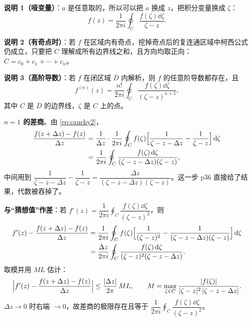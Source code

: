 \documentclass[11pt]{ctexart}
\let\origsubhdr\subhdr
\renewcommand{\subhdr}[1]{\par\needspace{4\baselineskip}\origsubhdr{#1}}
\begin{document}


\textbf{说明 1（哑变量）}：$a$ 是任意取的，所以可以把 $a$ 换成 $z$，把积分变量换成 $\zeta$：
\begin{equation}\label{eq:cauchy2}
f(z)=\frac{1}{2\pi i}\oint_C\frac{f(\zeta)\dd\zeta}{\zeta-z} .
\end{equation}


\textbf{说明 2（有奇点时）}：若 $f$ 在区域内有奇点，挖掉奇点后的复连通区域中柯西公式仍成立，只要把 $C$ 理解成所有边界线之和，且方向均取正向：$C=c_0+c_1+\cdots+c_n$。

\textbf{说明 3（高阶导数）}：若 $f$ 在闭区域 $\overline{D}$ 内解析，则 $f$ 的任意阶导数都存在，且
\begin{equation}\label{eq:highderiv}
f^{(n)}(z)=\frac{n!}{2\pi i}\oint_C\frac{f(\zeta)\dd\zeta}{(\zeta-z)^{n+1}} ,
\end{equation}
其中 $C$ 是 $\overline{D}$ 的边界线，$\zeta$ 是 $C$ 上的点。


\textbf{$n=1$ 的差商}。由 \eqref{eq:cauchy2}，
\begin{align}
\frac{f(z+\Delta z)-f(z)}{\Delta z}
&=\frac{1}{\Delta z}\cdot\frac{1}{2\pi i}\oint_C f(\zeta)
\Bigl[\frac{1}{\zeta-z-\Delta z}-\frac{1}{\zeta-z}\Bigr]\,\mathrm{d}\zeta\notag\\
&=\frac{1}{2\pi i}\oint_C\frac{f(\zeta)\,\mathrm{d}\zeta}{(\zeta-z-\Delta z)(\zeta-z)} ,
\end{align}
中间用到 $\dfrac{1}{\zeta-z-\Delta z}-\dfrac{1}{\zeta-z}=\dfrac{\Delta z}{(\zeta-z-\Delta z)(\zeta-z)}$。这一步 p36 直接给了结果，代数被吞掉了。

\textbf{与“猜想值”作差}：若 $f'(z)=\dfrac{1}{2\pi i}\displaystyle\oint_C\dfrac{f(\zeta)\dd\zeta}{(\zeta-z)^{2}}$，则
\begin{align}
f'(z)-\frac{f(z+\Delta z)-f(z)}{\Delta z}
&=\frac{1}{2\pi i}\oint_C f(\zeta)\Bigl[\frac{1}{(\zeta-z)^{2}}-\frac{1}{(\zeta-z-\Delta z)(\zeta-z)}\Bigr]\,\mathrm{d}\zeta\notag\\
&=\frac{\Delta z}{2\pi i}\oint_C\frac{f(\zeta)\,\mathrm{d}\zeta}{(\zeta-z)^{2}(\zeta-z-\Delta z)} .
\end{align}
取模并用 $ML$ 估计：
\[ \Bigl|f'(z)-\frac{f(z+\Delta z)-f(z)}{\Delta z}\Bigr|
\le\frac{|\Delta z|}{2\pi}\,M L,\qquad
M=\max_{\zeta\in C}\frac{|f(\zeta)|}{|\zeta-z|^{2}\,|\zeta-z-\Delta z|} . \]
$\Delta z\to0$ 时右端 $\to0$，故差商的极限存在且等于 $\dfrac{1}{2\pi i}\displaystyle\oint_C\dfrac{f(\zeta)\dd\zeta}{(\zeta-z)^{2}}$。
\end{document}
